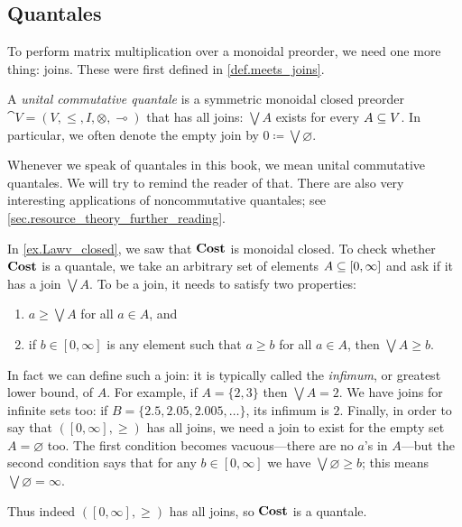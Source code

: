 \documentclass[7Sketches]{subfiles}
\begin{document}
\subsection{Quantales}%
\label{subsec.comm_quantales}%
To perform matrix multiplication over a monoidal preorder, we need one more
thing: joins. These were first defined in \cref{def.meets_joins}.%

\begin{definition}%
\label{def.quantale}%
A \emph{unital commutative quantale} is a symmetric monoidal closed preorder $\cat{V}=(V,\leq,I,\otimes,\multimap)$ that has all joins: $\bigvee A$ exists for every $A\ss V$. In particular, we often denote the empty join by $0\coloneqq\bigvee\varnothing$.
\end{definition}

Whenever we speak of quantales in this book, we mean unital commutative
quantales. We will try to remind the reader of that. There are also very interesting
applications of noncommutative quantales; see
\cref{sec.resource_theory_further_reading}.

\begin{example}%
%
%
  In \cref{ex.Lawv_closed}, we saw that $\Cost$ is monoidal closed. To check
  whether $\Cost$ is a quantale, we take an arbitrary set of elements
  $A\ss[0,\infty]$ and ask if it has a join $\bigvee A$. To be a join, it needs
  to satisfy two properties:
\begin{enumerate}[label=\alph*.]
	\item $a\geq\bigvee A$ for all $a\in A$, and
	\item if $b\in[0,\infty]$ is any element such that $a\geq b$ for all $a\in A$, then $\bigvee A\geq b$.
\end{enumerate}
In fact we can define such a join: it is typically called the \emph{infimum}, or greatest lower bound, of $A$.%
For example, if $A=\{2,3\}$ then $\bigvee A=2$. We have joins for infinite sets too: if $B=\{2.5, 2.05, 2.005, \ldots\}$, its infimum is $2$. Finally, in order to say that $([0,\infty],\geq)$ has all joins, we need a join to exist for the empty set $A=\varnothing$ too. The first condition becomes vacuous---there are no $a$'s in $A$---but the second condition says that for any $b\in [0,\infty]$ we have $\bigvee\varnothing\geq b$; this means $\bigvee\varnothing=\infty$.

Thus indeed $([0,\infty],\geq)$ has all joins, so $\Cost$ is a quantale.
\end{example}
\end{document}
